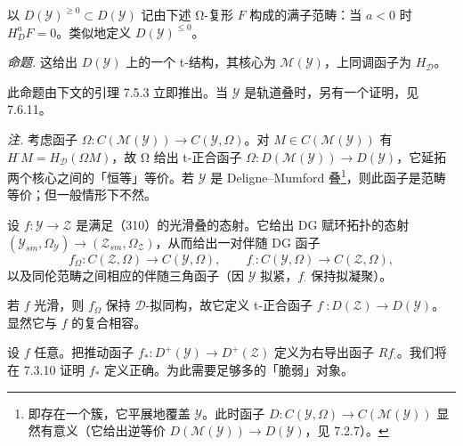 

以 $D(\mathcal{Y})^{\ge0}\subset D(\mathcal{Y})$ 记由下述 Ω-复形 $F$ 构成的满子范畴：当 $a<0$ 时 $H^{a}_{D}F=0$。类似地定义 $D(\mathcal{Y})^{\le0}$。

 \emph{命题.} 这给出 $D(\mathcal{Y})$ 上的一个 t-结构，其核心为 $\mathcal{M}(\mathcal{Y})$，上同调函子为 $H_{\mathcal{D}}$。

此命题由下文的引理 7.5.3 立即推出。当 $\mathcal{Y}$ 是轨道叠时，另有一个证明，见 7.6.11。

 \emph{注.} 考虑函子 $\Omega:C(\mathcal{M}(\mathcal{Y}))\to C(\mathcal{Y},\Omega)$。对 $M\in C(\mathcal{M}(\mathcal{Y}))$ 有 $H^{\cdot}M=H_{\mathcal{D}}(\Omega M)$，故 Ω 给出 t-正合函子 $\Omega:D(\mathcal{M}(\mathcal{Y}))\to D(\mathcal{Y})$，它延拓两个核心之间的「恒等」等价。若 $\mathcal{Y}$ 是 Deligne--Mumford 叠\footnote{即存在一个簇，它平展地覆盖 $\mathcal{Y}$。此时函子 $D:C(\mathcal{Y},\Omega)\to C(\mathcal{M}(\mathcal{Y}))$ 显然有意义（它给出逆等价 $D(\mathcal{M}(\mathcal{Y}))\to D(\mathcal{Y})$，见 7.2.7）。}，则此函子是范畴等价；但一般情形下不然。

 设 $f:\mathcal{Y}\to\mathcal{Z}$ 是满足（310）的光滑叠的态射。它给出 DG 赋环拓扑的态射 $(\mathcal{Y}_{sm},\Omega_{\mathcal{Y}})\to(\mathcal{Z}_{sm},\Omega_{\mathcal{Z}})$，从而给出一对伴随 DG 函子
\begin{equation}\tag{311}
f_{\Omega}^{\cdot}:C(\mathcal{Z},\Omega)\to C(\mathcal{Y},\Omega),\qquad
f_{\cdot}:C(\mathcal{Y},\Omega)\to C(\mathcal{Z},\Omega),
\end{equation}
以及同伦范畴之间相应的伴随三角函子（因 $\mathcal{Y}$ 拟紧，$f_{\cdot}$ 保持拟凝聚）。

若 $f$ 光滑，则 $f_{\Omega}^{\cdot}$ 保持 $\mathcal{D}$-拟同构，故它定义 t-正合函子 $f^{\cdot}:D(\mathcal{Z})\to D(\mathcal{Y})$。显然它与 $f$ 的复合相容。

设 $f$ 任意。把推动函子 $f_{*}:D^{+}(\mathcal{Y})\to D^{+}(\mathcal{Z})$ 定义为右导出函子 $Rf_{\cdot}$。我们将在 7.3.10 证明 $f_{*}$ 定义正确。为此需要足够多的「脆弱」对象。

